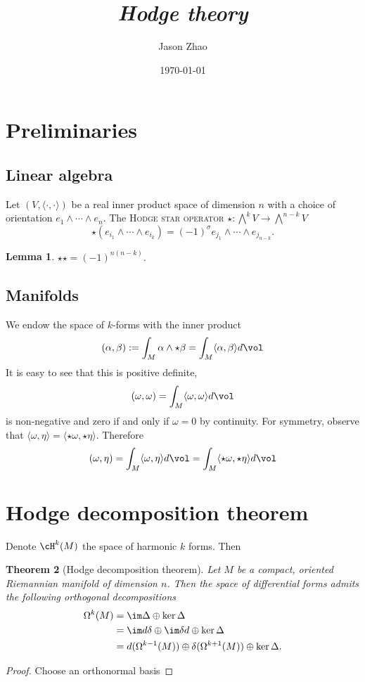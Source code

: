 \documentclass[reqno]{amsart}
\title
{
	\emph{Hodge theory}
}
\author{Jason Zhao}
\date{\today}
\newtheorem{theorem}{Theorem}
\newtheorem{lemma}[theorem]{Lemma}
\theoremstyle{definition}
\theoremstyle{remark}
\renewcommand{\emph}{\textsc}
\begin{document}
\maketitle
\tableofcontents

\section{Preliminaries}

\subsection{Linear algebra}

Let $(V, \langle \cdot, \cdot \rangle)$ be a real inner product space of dimension $n$ with a choice of orientation $e_1 \wedge \cdots \wedge e_n$. The \emph{Hodge star operator} $\star : \bigwedge^k V \to \bigwedge^{n - k} V$
	\[ \star (e_{i_1} \wedge \cdots \wedge e_{i_k}) = (-1)^\sigma e_{j_1} \wedge \cdots \wedge e_{j_{n - k}}. \]
	
\begin{lemma}
	$\star \star = (-1)^{n (n - k)}$.
\end{lemma}

\subsection{Manifolds}

We endow the space of $k$-forms with the inner product
	\[ (\alpha, \beta) := \int_M \alpha \wedge \star \beta = \int_M \langle \alpha, \beta \rangle d \vol \]
It is easy to see that this is positive definite, 
	\[ (\omega, \omega) = \int_M \langle \omega, \omega \rangle d \vol \]
is non-negative and zero if and only if $\omega = 0$ by continuity. For symmetry, observe that $\langle \omega, \eta \rangle = \langle \star \omega, \star \eta \rangle$. Therefore
	\[ (\omega, \eta) = \int_M \langle \omega, \eta \rangle d \vol = \int_M \langle \star \omega, \star \eta \rangle d \vol \]

\section{Hodge decomposition theorem}

Denote $\cH^k (M)$ the space of harmonic $k$ forms. Then

\begin{theorem}[Hodge decomposition theorem]
	Let $M$ be a compact, oriented Riemannian manifold of dimension $n$. Then the space of differential forms admits the following orthogonal decompositions
		\begin{align*}
			\Omega^k (M) 
				&= \im \Delta \oplus \ker \Delta \\
				&= \im d \delta  \oplus \im \delta d \oplus \ker \Delta\\
				& = d (\Omega^{k - 1} (M)) \oplus \delta (\Omega^{k + 1} (M)) \oplus \ker \Delta.
		\end{align*}		
\end{theorem}

\begin{proof}
	Choose an orthonormal basis 
\end{proof}
\end{document}

